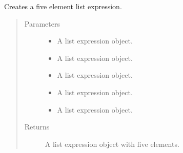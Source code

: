 \documentclass[letterpaper,10pt,english]{sphinxmanual}
\begin{document}
\begin{fulllineitems}
\label{\detokenize{index:secondodb.api.support.secondolistexpr.five_element_list}}
Creates a five element list expression.
\begin{quote}\begin{description}
\item[{Parameters}] \leavevmode\begin{itemize}
\item {} 
 \textendash{} A list expression object.

\item {} 
 \textendash{} A list expression object.

\item {} 
 \textendash{} A list expression object.

\item {} 
 \textendash{} A list expression object.

\item {} 
 \textendash{} A list expression object.

\end{itemize}

\item[{Returns}] \leavevmode
A list expression object with five elements.

\end{description}\end{quote}

\end{fulllineitems}

\end{document}
